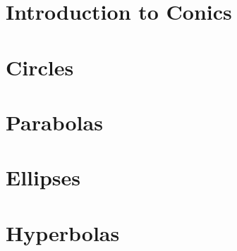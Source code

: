 \section{Introduction to Conics}



\newpage

\section{Circles}



\newpage

\section{Parabolas}



\newpage

\section{Ellipses}



\newpage

\section{Hyperbolas}

